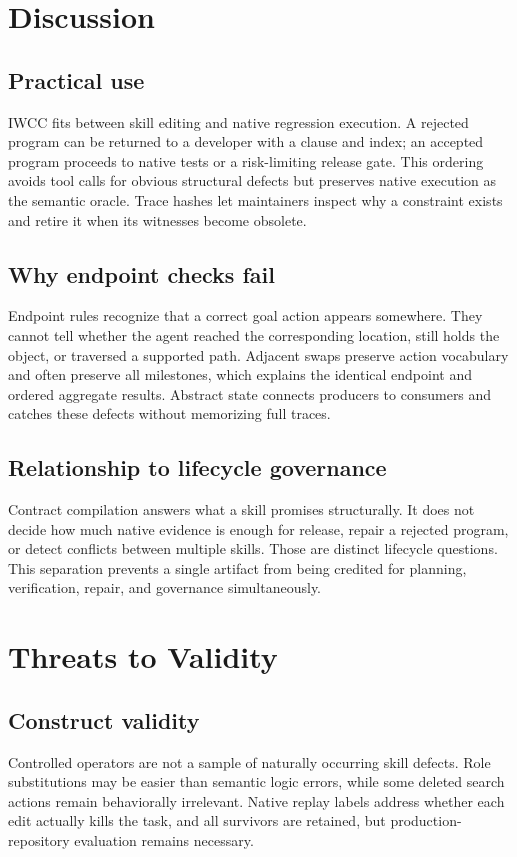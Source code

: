\documentclass[pdflatex,sn-basic]{sn-jnl}
\begin{document}
\section{Discussion}
\subsection{Practical use}
IWCC fits between skill editing and native regression execution. A rejected program can be returned to a developer with a clause and index; an accepted program proceeds to native tests or a risk-limiting release gate. This ordering avoids tool calls for obvious structural defects but preserves native execution as the semantic oracle. Trace hashes let maintainers inspect why a constraint exists and retire it when its witnesses become obsolete.

\subsection{Why endpoint checks fail}
Endpoint rules recognize that a correct goal action appears somewhere. They cannot tell whether the agent reached the corresponding location, still holds the object, or traversed a supported path. Adjacent swaps preserve action vocabulary and often preserve all milestones, which explains the identical endpoint and ordered aggregate results. Abstract state connects producers to consumers and catches these defects without memorizing full traces.

\subsection{Relationship to lifecycle governance}
Contract compilation answers what a skill promises structurally. It does not decide how much native evidence is enough for release, repair a rejected program, or detect conflicts between multiple skills. Those are distinct lifecycle questions. This separation prevents a single artifact from being credited for planning, verification, repair, and governance simultaneously.

\section{Threats to Validity}
\subsection{Construct validity}
Controlled operators are not a sample of naturally occurring skill defects. Role substitutions may be easier than semantic logic errors, while some deleted search actions remain behaviorally irrelevant. Native replay labels address whether each edit actually kills the task, and all survivors are retained, but production-repository evaluation remains necessary.
\end{document}
